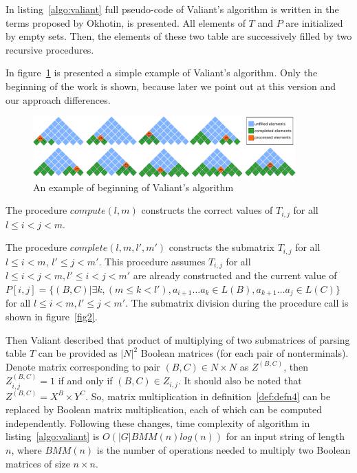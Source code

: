 In listing~\ref{algo:valiant} full pseudo-code of Valiant's algorithm is written in the terms proposed by Okhotin, is presented. All elements of $T$ and $P$ are initialized by empty sets. Then, the elements of these two table are successively filled by two recursive procedures. 

In figure~\ref{fig1} is presented a simple example of Valiant's algorithm. Only the beginning of the work is shown, because later we point out at this version and our approach differences. 

\begin{figure}
    \centering
    \includegraphics[width=0.900\textwidth]{pictures/valbeg2.pdf}
    \caption{An example of beginning of Valiant's algorithm}
    \label{fig1}
\end{figure}

The procedure $compute(l, m)$ constructs the correct values of $T_{i,j}$ for all $l \le i < j < m$.

The procedure $complete(l, m, l', m')$ constructs the submatrix $T_{i, j}$ for all $l \le i < m$, $l' \le j < m'$. This procedure assumes $T_{i, j}$ for all $l \leq i < j < m,  l' \leq i < j < m'$ are already constructed and the current value of  $P[i, j] =  \{ (B, C) |\exists k, (m \le k < l'), a_{i + 1} \dots a_{k} \in L(B), a_{k + 1} \dots a_{j} \in L(C)\}$ for all $l \leq i < m,  l' \leq j < m'$. The submatrix division during the procedure call is shown in figure~\ref{fig2}.

Then Valiant described that product of multiplying of two submatrices of parsing table $T$ can be provided as $|N|^2$ Boolean matrices (for each pair of nonterminals). Denote matrix corresponding to pair $(B, C) \in N \times N$ as $Z^{(B, C)}$, then $Z_{i, j}^{(B, C)} = 1$ if and only if $(B, C) \in Z_{i, j}$. It should also be noted that $Z^{(B, C)} = X^{B} \times Y^{C}$. So, matrix multiplication in definition~\ref{def:defn4} can be replaced by Boolean matrix multiplication, each of which can be computed independently. Following these changes, time complexity of algorithm in listing~\ref{algo:valiant} is $O(|G|BMM(n)log(n))$ for an input string of length $n$, where $BMM(n)$ is the number of operations needed to multiply two Boolean matrices of size $n \times n$.

